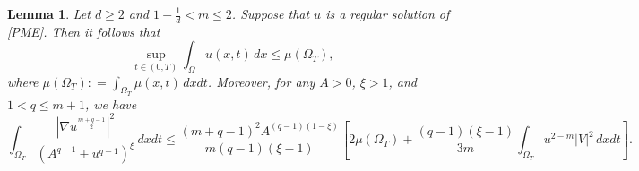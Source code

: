 \documentclass[10pt,a4paper]{amsart}
\newtheorem{lemma}{Lemma}
\begin{document}
\begin{lemma}\label{L1}
Let $d\geq 2$ and $1-\frac{1}{d} < m \leq 2$.
Suppose that $u$ is a regular solution of \eqref{PME}.
Then it follows that
\begin{equation}\label{Estimate01}
	\sup_{t\in (0, T)} \int_{\Omega} u(x, t) \,dx \leq \mu (\Omega_{T}),
\end{equation}
where $\mu(\Omega_T): = \int_{\Omega_T} \mu(x,t) \, dxdt$. 
Moreover, for any $A>0$, $\xi > 1$, and $1 < q \le m+1$, we have
\begin{equation}\label{Estimate02}
	\int_{\Omega_T} \frac{\left|\nabla u^{\frac{m+q-1}{2}}\right|^2}{\left(A^{q-1} + u^{q-1}\right)^{\xi}} \,dxdt		
	\leq \frac{(m+q-1)^2 A^{(q-1)(1-\xi)}}{m(q-1)(\xi-1)} \left[ 2\mu(\Omega_{T}) + \frac{(q-1)(\xi-1)}{3m}\int_{\Omega_T} u^{2-m} |V|^2 \,dxdt\right].
\end{equation}
\end{lemma}
\end{document}
